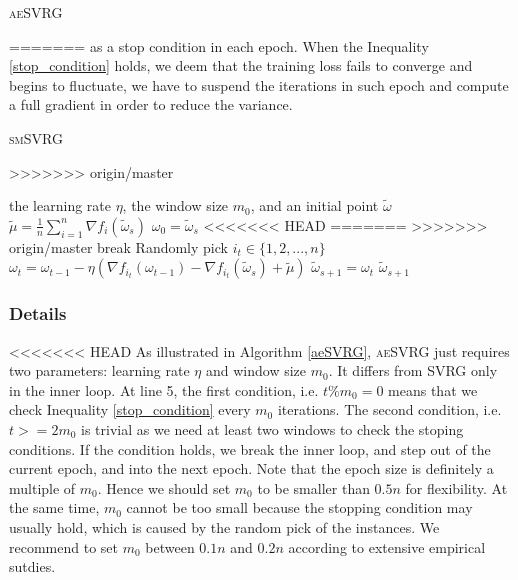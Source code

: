 \documentclass[conference]{IEEEtran}
\begin{document}
  \begin{algorithm}[t]
 	\caption{\textsc{aeSVRG}}
	\label{aeSVRG}
=======
 as a stop condition in each epoch. When the Inequality \ref{stop_condition} holds, we deem that the training loss fails to converge and begins to fluctuate, we have to suspend the iterations in such epoch and compute a full gradient in order to reduce the variance.
 
  \begin{algorithm}[t]
 	\caption{\textsc{smSVRG}}
	\label{smSVRG}
>>>>>>> origin/master
	\begin{algorithmic}[1]
	\Require the learning rate $\eta$, the window size $m_0$, and an initial point $\tilde{\omega}$
		\State $\tilde{\mu} = \frac{1}{n}\sum\limits_{i=1}^{n}\nabla f_{i}(\tilde{\omega}_{s})$
		\State $\omega_0 = \tilde{\omega}_s$
<<<<<<< HEAD
=======
>>>>>>> origin/master
			\State break
			\EndIf
			\State Randomly pick $i_t\in\{1, 2, ..., n\}$
			\State $\omega_t = \omega_{t-1} - \eta(\nabla f_{i_t}(\omega_{t-1}) - \nabla f_{i_t}(\tilde{\omega}_s)+\tilde{\mu})$
		\EndFor		
		\State $\tilde{\omega}_{s+1} = \omega_{t}$
	\EndFor
	\State \Return $\tilde{\omega}_{s+1}$
	\end{algorithmic}
\end{algorithm}

 
\subsubsection{Details}
<<<<<<< HEAD
As illustrated in Algorithm \ref{aeSVRG}, \textsc{aeSVRG} just requires two parameters: learning rate $\eta$ and window size $m_0$. It differs from SVRG only in the inner loop. At line 5, the first condition, i.e. $t\%m_0=0$ means that  we check Inequality \ref{stop_condition} every $m_0$ iterations. The second condition, i.e. $t>=2m_0$ is trivial as we need at least two windows to check the stoping conditions.  If the condition holds, we break the inner loop, and step out of the current epoch, and into the next epoch. Note that the epoch size is definitely a multiple of $m_0$. Hence we should set $m_0$ to be smaller than $0.5n$ for flexibility. At the same time, $m_0$ cannot be too small because the stopping condition may usually hold, which is caused by the random pick of the instances. We recommend to set $m_0$ between $0.1n$ and $0.2n$ according to extensive empirical sutdies.


\end{algorithm}
\end{document}
